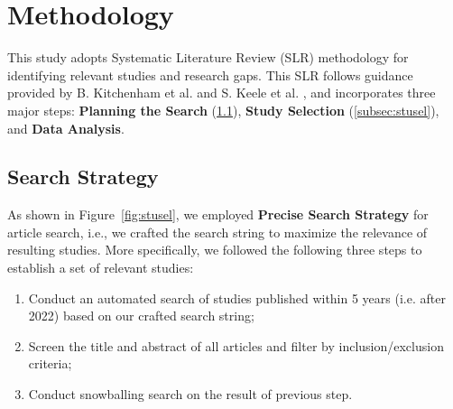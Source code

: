 \section{Methodology}\label{sec:method}

This study adopts Systematic Literature Review (SLR) methodology for 
identifying relevant studies and research gaps. This SLR follows 
guidance provided by B. Kitchenham et al. \citep{segress} and
S. Keele et al. \citep{slrguidese}, and incorporates three major
steps: \textbf{Planning the Search} (\ref{subsec:search}), 
\textbf{Study Selection} (\ref{subsec:stusel}),
and \textbf{Data Analysis}.

\subsection{Search Strategy}\label{subsec:search}

As shown in Figure~\ref{fig:stusel},
we employed \textbf{Precise Search Strategy} \citep{optimalsearch}
for article search, i.e., 
we crafted the search string to maximize the relevance 
of resulting studies. More specifically, we followed the following three steps
to establish a set of relevant studies:


\begin{enumerate}
 \item Conduct an automated search of studies published within 5 years
  (i.e. after 2022)  based on our crafted search string;
 \item Screen the title and abstract of all articles and filter by
       inclusion/exclusion criteria;
 \item Conduct snowballing search on the result of previous step.
\end{enumerate}

